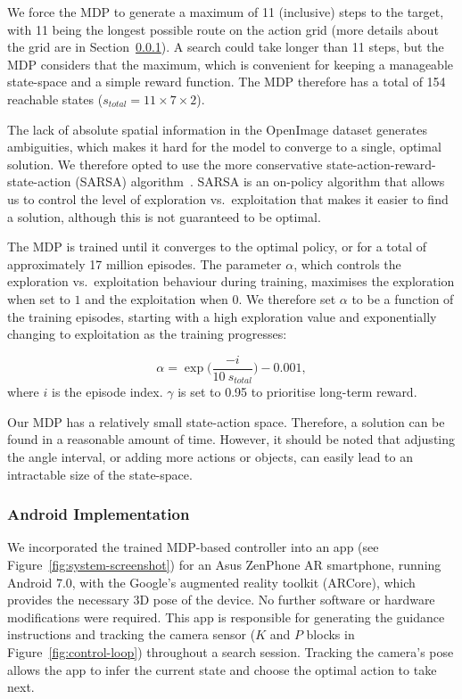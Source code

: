 \documentclass[a4paper, twoside]{article}
\begin{document}
We force the MDP to generate a maximum of 11 (inclusive) steps to the target, with 11 being the longest possible route on the action grid (more details about the grid are in Section~\ref{sec:system-implementation}). A search could take longer than 11 steps, but the MDP considers that the maximum, which is convenient for keeping a manageable state-space and a simple reward function. The MDP therefore has a total of 154 reachable states ($s_{total}=11\times7\times2$).

The lack of absolute spatial information in the OpenImage dataset generates ambiguities, which makes it hard for the model to converge to a single, optimal solution. We therefore opted to use the more conservative state-action-reward-state-action (SARSA) algorithm~\cite{rummery1994line}. SARSA is an on-policy algorithm that allows us to control the level of exploration vs.\ exploitation that makes it easier to find a solution, although this is not guaranteed to be optimal. 

The MDP is trained until it converges to the optimal policy, or for a total of approximately 17 million episodes. The parameter $\alpha$, which controls the exploration vs.\ exploitation behaviour during training, maximises the exploration when set to $1$ and the exploitation when $0$. We therefore set $\alpha$ to be a function of the training episodes, starting with a high exploration value and exponentially changing to exploitation as the training progresses: 

\begin{equation}
  \alpha = \exp\Big(\frac{-i}{10~s_{total}}\Big) - 0.001,
\end{equation}
where $i$ is the episode index.  $\gamma$ is set to 0.95 to prioritise long-term reward. 

Our MDP has a relatively small state-action space. Therefore, a solution can be found in a reasonable amount of time. However, it should be noted that adjusting the angle interval, or adding more actions or objects, can easily lead to an intractable size of the state-space. 

\subsubsection{Android Implementation}\label{sec:system-implementation}

We incorporated the trained MDP-based controller into an app (see Figure~\ref{fig:system-screenshot}) for an Asus ZenPhone AR smartphone, running Android 7.0, with the Google's augmented reality toolkit (ARCore), which provides the necessary 3D pose of the device. No further software or hardware modifications were required. This app is responsible for generating the guidance instructions and tracking the camera sensor ($K$ and $P$ blocks in Figure~\ref{fig:control-loop}) throughout a search session. Tracking the camera's pose allows the app to infer the current state and choose the optimal action to take next. 
\end{document}
